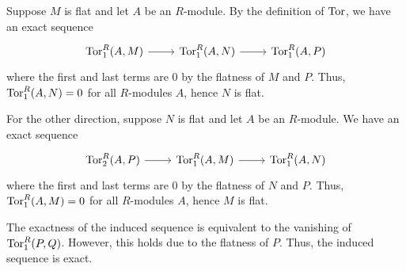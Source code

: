 \documentclass[../../master.tex]{subfiles}
\begin{document}
\begin{solution}
    Suppose $M$ is flat and let $A$ be an $R$-module.
    By the definition of $\operatorname{Tor}$, we have an exact sequence
    \[
    \begin{tikzcd}
        \Tor_1^{R}(A, M) & \Tor_1^{R}(A, N) & \Tor_1^{R}(A, P)
        \arrow[from=1-1, to=1-2]
        \arrow[from=1-2, to=1-3]
    \end{tikzcd}
    \]
    where the first and last terms are 0 by the flatness of $M$ and $P$.
    Thus, $\operatorname{Tor}_1^{R}(A, N) = 0$ for all $R$-modules $A$, hence $N$ is flat.

    For the other direction, suppose $N$ is flat and let $A$ be an $R$-module.
    We have an exact sequence
    \[
    \begin{tikzcd}
        \Tor_2^{R}(A, P) & \Tor_1^{R}(A, M) & \Tor_1^{R}(A, N)
        \arrow[from=1-1, to=1-2]
        \arrow[from=1-2, to=1-3] 
    \end{tikzcd}
    \]
    where the first and last terms are 0 by the flatness of $N$ and $P$.
    Thus, $\operatorname{Tor}_1^{R}(A, M) = 0$ for all $R$-modules $A$, hence $M$ is flat.

    The exactness of the induced sequence is equivalent to the vanishing of $\operatorname{Tor}_1^{R}(P, Q)$.
    However, this holds due to the flatness of $P$.
    Thus, the induced sequence is exact.
\end{solution}
\end{document}
